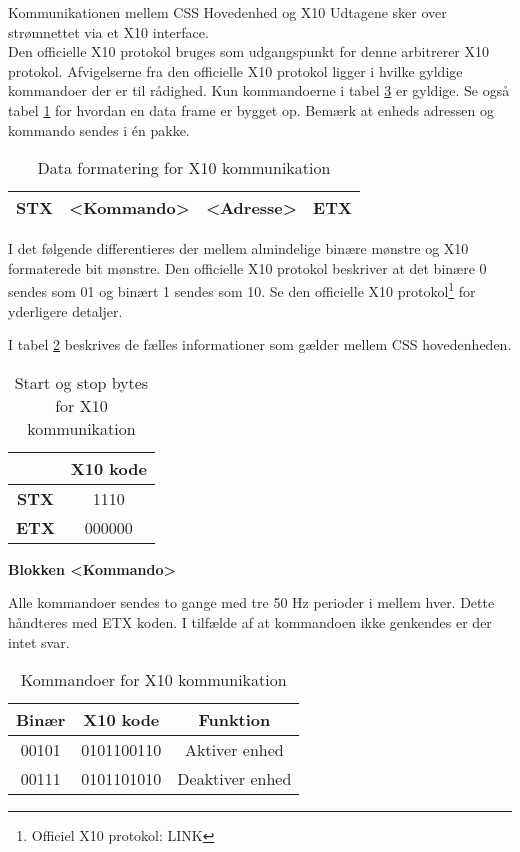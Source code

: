 Kommunikationen mellem CSS Hovedenhed og X10 Udtagene sker over strømnettet via et X10 interface.\\

Den officielle X10 protokol bruges som udgangspunkt for denne arbitrerer X10 protokol.
Afvigelserne fra den officielle X10 protokol ligger i hvilke gyldige kommandoer der er til rådighed. Kun kommandoerne i tabel \ref{tabel:X10Kommandoer} er gyldige. Se også tabel \ref{table:X10DataFormat} for hvordan en data frame er bygget op. Bemærk at   enheds adressen og kommando sendes i én pakke.

\begin{table}[h]
	\caption{Data formatering for X10 kommunikation}
	\centering
	\begin{tabular}{|c|c|c|c|}
		\hline 
		STX & <Kommando> & <Adresse> & ETX \\
		\hline 
	\end{tabular} 
	\label{table:X10DataFormat}
\end{table}

I det følgende differentieres der mellem almindelige binære mønstre og X10 formaterede bit mønstre.
Den officielle X10 protokol beskriver at det binære 0 sendes som 01 og binært 1 sendes som 10. Se den officielle X10 protokol\footnote{Officiel X10 protokol: LINK} for yderligere detaljer.

I tabel \ref{table:X10StartStopBytes} beskrives de fælles informationer som gælder mellem CSS hovedenheden.

\begin{table}[h]
	\caption{Start og stop bytes for X10 kommunikation}
	\centering
	\begin{tabular}{|c|c|}
		\hline 
		& \textbf{X10 kode} \\ 
		\hline 
		\textbf{STX} & 1110\\ 
		\hline 
		\textbf{ETX} & 000000 \\ 
		\hline 
	\end{tabular} 
	\label{table:X10StartStopBytes}
\end{table}

\textbf{Blokken <Kommando>}

Alle kommandoer sendes to gange med tre 50 Hz perioder i mellem hver. Dette håndteres med ETX koden.
I tilfælde af at kommandoen ikke genkendes er der intet svar.

\begin{table}[h]
\caption{Kommandoer for X10 kommunikation}
\centering
\begin{tabular}{|c|c|c|}
\hline 
\textbf{Binær} & \textbf{X10 kode} & \textbf{Funktion} \\ 
\hline 
00101 & 0101100110 & Aktiver enhed \\ 
\hline 
00111 & 0101101010 & Deaktiver enhed \\ 
\hline
\end{tabular}
\label{tabel:X10Kommandoer}
\end{table} 

